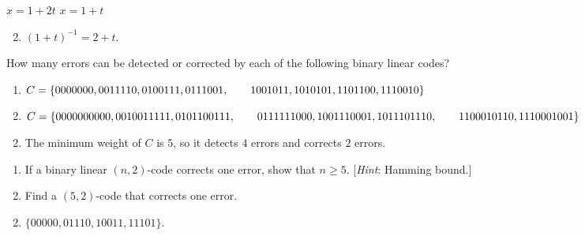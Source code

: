 \begin{multicols}{2}
\begin{ex}
\begin{exenumerate}
\exitem $x = 1 + 2t$
\exitem $x = 1 + t$
\end{exenumerate}
\begin{sol}
\begin{enumerate}[label={\alph*.}]
\setcounter{enumi}{1}
\item  $(1 + t)^{-1} = 2 + t$.

\end{enumerate}
\end{sol}
\end{ex}

\begin{ex} \label{ex:8_7_10}
How many errors can be detected or corrected by each of the following binary linear codes?

\begin{enumerate}[label={\alph*.}]
\item $C = \{0000000, 0011110, 0100111, 0111001, \\ \hspace*{2em} 1001011, 1010101, 1101100, 1110010\}$

\item $C = \{0000000000, 0010011111, 0101100111,\\ \hspace*{2em} 0111111000, 1001110001, 1011101110,\\ \hspace*{2em} 1100010110, 1110001001\}$

\end{enumerate}
\begin{sol}
\begin{enumerate}[label={\alph*.}]
\setcounter{enumi}{1}
\item  The minimum weight of $C$ is $5$, so it detects $4$ errors and corrects $2$ errors.

\end{enumerate}
\end{sol}
\end{ex}

\begin{ex}
\begin{enumerate}[label={\alph*.}]
\item If a binary linear $(n, 2)$-code corrects one error, show that $n \geq 5$. [\textit{Hint}: Hamming bound.]

\item Find a $(5, 2)$-code that corrects one error.

\end{enumerate}
\begin{sol}
\begin{enumerate}[label={\alph*.}]
\setcounter{enumi}{1}
\item  $\{00000, 01110, 10011, 11101\}.$


\end{enumerate}
\end{sol}
\end{ex}
\end{multicols}
